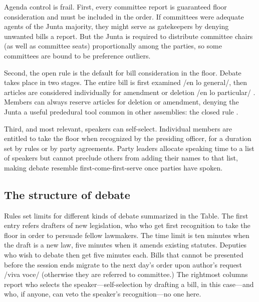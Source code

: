 \documentclass[letter,12pt]{article}
\begin{document}
Agenda control is frail. First, every committee report is guaranteed floor consideration and must be included in the order. If committees were adequate agents of the Junta majority, they might serve as gatekeepers by denying unwanted bills a report. But the Junta is required to distribute committee chairs (as well as committee seats) proportionally among the parties, so some committees are bound to be preference outliers.

Second, the open rule is the default for bill consideration in the floor. Debate takes place in two stages. The entire bill is first examined /en lo general/, then articles are considered individually for amendment or deletion /en lo particular/ \citep[see][]{heller.weldon.nd}. Members can always reserve articles for deletion or amendment, denying the Junta a useful prededural tool common in other assemblies: the closed rule \citep[eg.,][]{cox.2006,weingast.1992,magar-palanza-sin-Pdt-fast-track-chile-2021jop}.

Third, and most relevant, speakers can self-select. Individual members are entitled to take the floor when recognized by the presiding officer, for a duration set by rules or by party agreements. Party leaders allocate speaking time to a list of speakers but cannot preclude others from adding their names to that list, making debate resemble first-come-first-serve once parties have spoken. 


  \subsection{The structure of debate}
Rules set limits for different kinds of debate summarized in the Table. The first entry refers drafters of new legislation, who who get first recognition to take the floor in order to persuade fellow lawmakers. The time limit is ten minutes when the draft is a new law, five minutes when it amends existing statutes. Deputies who wish to debate then get five minutes each. Bills that cannot be presented before the session ends migrate to the next day's order upon author's request /viva voce/ (otherwise they are referred to committee.) The rightmost columns report who selects the speaker---self-selection by drafting a bill, in this case---and who, if anyone, can veto the speaker's recognition---no one here. 
\end{document}
